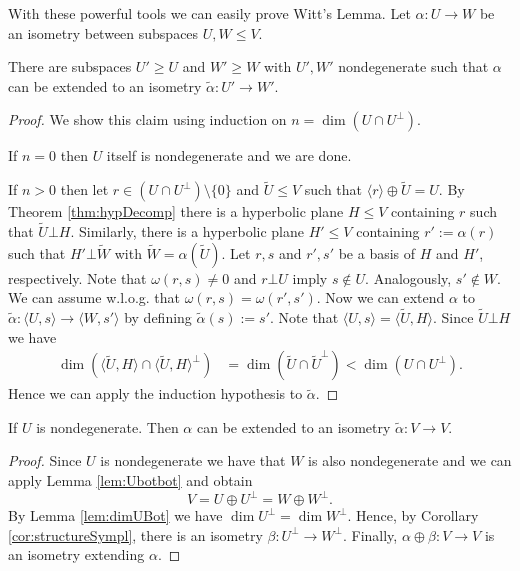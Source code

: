 With these powerful tools we can easily prove Witt's Lemma.
Let $\alpha\colon U\to W$ be an isometry between subspaces $U,W\leq V$.
\begin{lemma}\label{lem:wittPrep1}
There are subspaces $U'\geq U$ and $W'\geq W$ with $U',W'$ nondegenerate such that $\alpha$ can be extended to an isometry $\tilde{\alpha}\colon U'\to W'$.
\end{lemma}
\begin{proof}
We show this claim using induction on $n=\dim (U\cap U^\bot)$.

If $n=0$ then $U$ itself is nondegenerate and we are done.

If $n>0$ then let $r\in (U\cap U^\bot)\setminus\{0\}$ and $\tilde U\leq V$ such that $\langle r\rangle\oplus \tilde U=U$. By Theorem \ref{thm:hypDecomp} there is a hyperbolic plane $H\leq V$ containing $r$ such that $\tilde U\bot H$. 
Similarly, there is a hyperbolic plane $H'\leq V$ containing $r':=\alpha(r)$ such that $H'\bot\tilde{W}$ with $\tilde{W}=\alpha(\tilde{U})$. Let $r,s$ and $r',s'$ be a basis of $H$ and $H'$, respectively. Note that $\omega(r,s)\not=0$ and $r\bot U$ imply $s\notin U$. Analogously, $s'\notin W$. We can assume w.l.o.g. that $\omega(r,s)=\omega(r',s')$. Now we can extend $\alpha$ to $\tilde{\alpha}\colon \langle U,s\rangle\to \langle W,s'\rangle$ by defining $\tilde\alpha (s):= s'$. Note that $\langle U,s\rangle=\langle \tilde{U},H\rangle$. Since $\tilde{U}\bot H$ we have
\begin{align*}
\dim(\langle \tilde{U},H\rangle \cap \langle \tilde{U},H\rangle^\bot)&=\dim(\tilde{U}\cap \tilde{U}^\bot)<\dim(U\cap U^\bot).
\end{align*}
Hence we can apply the induction hypothesis to $\tilde{\alpha}$.
\end{proof}

\begin{lemma}\label{lem:wittPrep2}
If $U$ is nondegenerate. Then $\alpha$ can be extended to an isometry $\tilde{\alpha}\colon V\to V$.
\end{lemma}
\begin{proof}
Since $U$ is nondegenerate we have that $W$ is also nondegenerate and we can apply Lemma \ref{lem:Ubotbot} and obtain \[V=U\oplus U^\bot=W\oplus W^\bot.\]
By Lemma \ref{lem:dimUBot} we have $\dim U^\bot=\dim W^\bot$. Hence, by Corollary \ref{cor:structureSympl}, there is an isometry $\beta\colon U^\bot\to W^\bot$. Finally, $\alpha\oplus \beta\colon V\to V$ is an isometry extending $\alpha$.
\end{proof}

